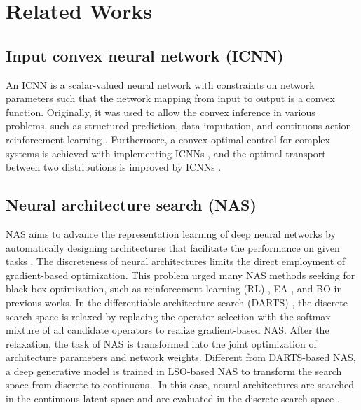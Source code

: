 \documentclass[10pt,twocolumn,letterpaper]{article}
\begin{document}
\section{Related Works}
\subsection{Input convex neural network (ICNN)}
An ICNN is a scalar-valued neural network with constraints on network parameters such that the network mapping from input to output is a convex function. Originally, it was used to allow the convex inference in various problems, such as structured prediction, data imputation, and continuous action reinforcement learning \cite{amos2017input}. Furthermore, a convex optimal control for complex systems is achieved with implementing ICNNs \cite{chen2018optimal}, and the optimal transport between two distributions is improved by ICNNs \cite{DBLP:conf/icml/MakkuvaTOL20}. 
	\subsection{Neural architecture search (NAS)}
NAS aims to advance the representation learning of deep neural networks by automatically designing architectures that facilitate the performance on given tasks \cite{he2021automl, elsken2019neural}. The discreteness of neural architectures limits the direct employment of gradient-based optimization. This problem urged many NAS methods seeking for black-box optimization, such as reinforcement learning (RL) \cite{zoph2016neural, DBLP:journals/ivc/JaafraLDN19, DBLP:conf/icml/PhamGZLD18, DBLP:conf/aaai/ChengWZCW022}, EA \cite{real2019regularized, DBLP:conf/eccv/NingZZWY20, liu2021survey}, and BO \cite{zhou2019bayesnas, DBLP:conf/aaai/WhiteNS21, DBLP:conf/iclr/RuW0O21} in previous works. In the differentiable architecture search (DARTS) \cite{liu2018darts, xu2021partially, chen2021progressive, DBLP:conf/bmvc/Chu021}, the discrete search space is relaxed by replacing the operator selection with the softmax mixture of all candidate operators to realize gradient-based NAS. After the relaxation, the task of NAS is transformed into the joint optimization of architecture parameters and network weights. Different from DARTS-based NAS, a deep generative model is trained in LSO-based NAS to transform the search space from discrete to continuous \cite{DBLP:conf/nips/YanZAZ020}. In this case, neural architectures are searched in the continuous latent space and are evaluated in the discrete search space \cite{luo2018neural, DBLP:conf/nips/ZhangJCGC19, chatzianastasis2021graph}.
\end{document}
